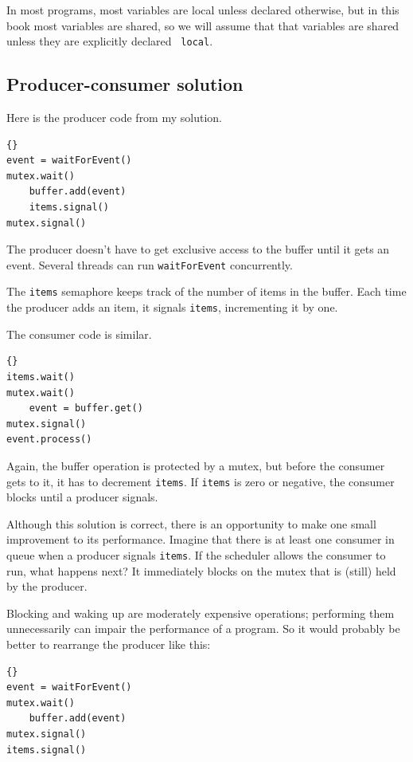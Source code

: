 \documentclass{book}
\newcommand{\clearemptydoublepage}{\newpage\cleardoublepage}
\begin{document}
In most programs, most variables are local unless declared otherwise,
but in this book most variables are shared, so we will assume that
that variables are shared unless they are explicitly declared {\tt
local}.



\clearemptydoublepage
\subsection{Producer-consumer solution}

Here is the producer code from my solution.

\begin{lstlisting}[caption={Producer solution}]{}
event = waitForEvent()
mutex.wait()
    buffer.add(event)
    items.signal()
mutex.signal()
\end{lstlisting}

The producer doesn't have to get exclusive access to the buffer
until it gets an event.  Several threads can run {\tt waitForEvent}
concurrently.

The {\tt items} semaphore keeps track of the
number of items in the buffer.  Each time the producer adds an
item, it signals {\tt items}, incrementing it by one.

The consumer code is similar.

\begin{lstlisting}[caption={Consumer solution}]{}
items.wait()
mutex.wait()
    event = buffer.get()
mutex.signal()
event.process()
\end{lstlisting}

Again, the buffer operation is protected by a mutex,
but before the consumer gets to it, it has to decrement
{\tt items}.  If {\tt items} is zero or negative, the
consumer blocks until a producer signals.

Although this solution is correct, there is an opportunity
to make one small improvement to its performance.  Imagine
that there is at least one consumer in queue when a producer
signals {\tt items}.  If the scheduler allows the consumer
to run, what happens next?  It immediately blocks on the
mutex that is (still) held by the producer.

Blocking and waking up are moderately expensive operations;
performing them unnecessarily can impair the performance of
a program.  So it would probably be better to rearrange the
producer like this:

\begin{lstlisting}[caption={Improved producer solution}]{}
event = waitForEvent()
mutex.wait()
    buffer.add(event)
mutex.signal()
items.signal()
\end{lstlisting}
\end{document}

